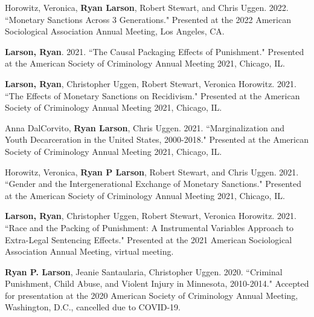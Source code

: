 \documentclass[letterpaper]{article}
\renewenvironment{itemize}{
  \begin{list}{}{
    \setlength{\leftmargin}{1.5em}
  }
}{
  \end{list}
}
\begin{document}
\begin{itemize}
\item Horowitz, Veronica, \textbf{Ryan Larson}, Robert Stewart, and Chris Uggen. 2022.  ``Monetary Sanctions Across 3 Generations." Presented at the 2022 American Sociological Association Annual Meeting, Los Angeles, CA. 

\item \textbf{Larson, Ryan}. 2021. ``The Causal Packaging Effects of Punishment." Presented at the American Society of Criminology Annual Meeting 2021, Chicago, IL. 

\item \textbf{Larson, Ryan}, Christopher Uggen, Robert Stewart, Veronica Horowitz. 2021. ``The Effects of Monetary Sanctions on Recidivism." Presented at the American Society of Criminology Annual Meeting 2021, Chicago, IL. 

\item Anna DalCorvito, \textbf{Ryan Larson}, Chris Uggen. 2021. ``Marginalization and Youth Decarceration in the United States, 2000-2018." Presented at the American Society of Criminology Annual Meeting 2021, Chicago, IL. 

\item Horowitz, Veronica, \textbf{Ryan P Larson}, Robert Stewart, and Chris Uggen. 2021. ``Gender and the Intergenerational Exchange of Monetary Sanctions." Presented at the American Society of Criminology Annual Meeting 2021, Chicago, IL. 

\item \textbf{Larson, Ryan}, Christopher Uggen, Robert Stewart, Veronica Horowitz. 2021. ``Race and the Packing of Punishment: A Instrumental Variables Approach to Extra-Legal Sentencing Effects." Presented at the 2021 American Sociological Association Annual Meeting, virtual meeting. 

\item \textbf{Ryan P. Larson}, Jeanie Santaularia, Christopher Uggen. 2020. ``Criminal Punishment, Child Abuse, and Violent Injury in Minnesota, 2010-2014." Accepted for presentation at the 2020 American Society of Criminology Annual Meeting, Washington, D.C., cancelled due to COVID-19.  


\end{itemize}
\end{document}
